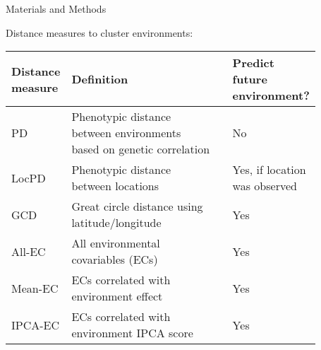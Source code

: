 \documentclass[final]{beamer}
\newlength{\sepwid}
\newlength{\onecolwid}
\newlength{\twocolwid}
\begin{document}
\begin{frame}[t]
\begin{columns}[t]
\begin{column}{\onecolwid}
\begin{block}{Materials and Methods}
\begin{footnotesize}
\end{footnotesize}


\vspace{1cm}


Distance measures to cluster environments:

\vspace{-0.5cm}

\begin{scriptsize}
\begin{table}[h]
\centering
\begin{tabular}{p{0.15\linewidth} p{0.58\linewidth} p{0.01\linewidth} p{0.21\linewidth}}
\toprule
\textbf{Distance measure} & \textbf{Definition} & & \textbf{Predict future environment?}\\
\midrule
PD & Phenotypic distance between environments based on genetic correlation \cite{Ouyang1995} & & No \\
LocPD & Phenotypic distance between locations & & Yes, if location was observed\\
GCD & Great circle distance using latitude/longitude & & Yes\\
All-EC & All environmental covariables (ECs) & & Yes\\
Mean-EC & ECs correlated with environment effect & & Yes\\
IPCA-EC & ECs correlated with environment IPCA score & & Yes\\
\bottomrule
\end{tabular}
\end{table}
\end{scriptsize}







\end{block}



\end{column} %

\begin{column}{\sepwid}\end{column} %

\begin{column}{\twocolwid} %


%


\end{column}
\end{columns}
\end{frame}
\end{document}
